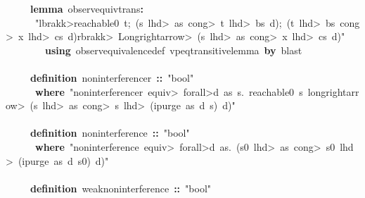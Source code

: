 \documentclass{article}
\newcommand{\syntaxKEYWORDA}[1]{\textcolor[rgb]{0.0,0.4,0.6}{\textbf{#1}}}
\newcommand{\syntaxKEYWORDB}[1]{\textcolor[rgb]{0.0,0.6,0.4}{\textbf{#1}}}
\newcommand{\syntaxLITERALA}[1]{\textcolor[rgb]{1.0,0.0,0.8}{#1}}
\newcommand{\syntaxOPERATOR}[1]{\textcolor[rgb]{0.0,0.0,0.0}{\textbf{#1}}}
\newcommand{\syntaxKEYWORDA}[1]{\textcolor[rgb]{0.0,0.4,0.6}{\textbf{#1}}}
\newcommand{\syntaxKEYWORDB}[1]{\textcolor[rgb]{0.0,0.6,0.4}{\textbf{#1}}}
\newcommand{\syntaxLITERALA}[1]{\textcolor[rgb]{1.0,0.0,0.8}{#1}}
\newcommand{\syntaxOPERATOR}[1]{\textcolor[rgb]{0.0,0.0,0.0}{\textbf{#1}}}
\newcommand{\syntaxKEYWORDA}[1]{\textcolor[rgb]{0.0,0.4,0.6}{\textbf{#1}}}
\newcommand{\syntaxKEYWORDB}[1]{\textcolor[rgb]{0.0,0.6,0.4}{\textbf{#1}}}
\newcommand{\syntaxLITERALA}[1]{\textcolor[rgb]{1.0,0.0,0.8}{#1}}
\newcommand{\syntaxOPERATOR}[1]{\textcolor[rgb]{0.0,0.0,0.0}{\textbf{#1}}}
\newcommand{\syntaxKEYWORDA}[1]{\textcolor[rgb]{0.0,0.4,0.6}{#1}}
\newcommand{\syntaxKEYWORDB}[1]{\textcolor[rgb]{0.0,0.6,0.4}{#1}}
\newcommand{\syntaxLITERALA}[1]{\textcolor[rgb]{1.0,0.0,0.8}{\textbf{#1}}}
\newcommand{\syntaxOPERATOR}[1]{\textcolor[rgb]{0.0,0.0,0.0}{#1}}
\newcommand{\syntaxKEYWORDA}[1]{\textcolor[rgb]{0.0,0.4,0.6}{\textbf{#1}}}
\newcommand{\syntaxKEYWORDB}[1]{\textcolor[rgb]{0.0,0.6,0.4}{\textbf{#1}}}
\newcommand{\syntaxLITERALA}[1]{\textcolor[rgb]{1.0,0.0,0.8}{#1}}
\newcommand{\syntaxOPERATOR}[1]{\textcolor[rgb]{0.0,0.0,0.0}{\textbf{#1}}}
\newcommand{\syntaxKEYWORDA}[1]{\textcolor[rgb]{0.0,0.4,0.6}{\textbf{#1}}}
\newcommand{\syntaxKEYWORDB}[1]{\textcolor[rgb]{0.0,0.6,0.4}{\textbf{#1}}}
\newcommand{\syntaxLITERALA}[1]{\textcolor[rgb]{1.0,0.0,0.8}{#1}}
\newcommand{\syntaxOPERATOR}[1]{\textcolor[rgb]{0.0,0.0,0.0}{\textbf{#1}}}
\begin{document}
{\ }{\ }{\ }{\ }{\ }\syntaxKEYWORDA{lemma}{\ }observ\usebox{\underscorebox}equiv\usebox{\underscorebox}trans\syntaxOPERATOR{:}\hspace*{\fill}\\
{\ }{\ }{\ }{\ }{\ }{\ }\syntaxLITERALA{"\<lbrakk>reachable0{\ }t;{\ }(s{\ }\<lhd>{\ }as{\ }\<cong>{\ }t{\ }\<lhd>{\ }bs{\ }\usebox{\atbox}{\ }d);{\ }(t{\ }\<lhd>{\ }bs{\ }\<cong>{\ }x{\ }\<lhd>{\ }cs{\ }\usebox{\atbox}{\ }d)\<rbrakk>{\ }\<Longrightarrow>{\ }(s{\ }\<lhd>{\ }as{\ }\<cong>{\ }x{\ }\<lhd>{\ }cs{\ }\usebox{\atbox}{\ }d)"}\hspace*{\fill}\\
{\ }{\ }{\ }{\ }{\ }{\ }{\ }{\ }\syntaxKEYWORDA{using}{\ }observ\usebox{\underscorebox}equivalence\usebox{\underscorebox}def{\ }vpeq\usebox{\underscorebox}transitive\usebox{\underscorebox}lemma{\ }\syntaxKEYWORDA{by}{\ }blast\hspace*{\fill}\\
\hspace*{\fill}\\
{\ }{\ }{\ }{\ }{\ }\syntaxKEYWORDA{definition}{\ }noninterference\usebox{\underscorebox}r{\ }\syntaxOPERATOR{::}{\ }\syntaxLITERALA{"bool"}\hspace*{\fill}\\
{\ }{\ }{\ }{\ }{\ }{\ }\syntaxKEYWORDB{where}{\ }\syntaxLITERALA{"noninterference\usebox{\underscorebox}r{\ }\<equiv>{\ }\<forall>d{\ }as{\ }s.{\ }reachable0{\ }s{\ }\<longrightarrow>{\ }(s{\ }\<lhd>{\ }as{\ }\<cong>{\ }s{\ }\<lhd>{\ }(ipurge{\ }as{\ }d{\ }s){\ }\usebox{\atbox}{\ }d)"}\hspace*{\fill}\\
\hspace*{\fill}\\
{\ }{\ }{\ }{\ }{\ }\syntaxKEYWORDA{definition}{\ }noninterference{\ }\syntaxOPERATOR{::}{\ }\syntaxLITERALA{"bool"}\hspace*{\fill}\\
{\ }{\ }{\ }{\ }{\ }{\ }\syntaxKEYWORDB{where}{\ }\syntaxLITERALA{"noninterference{\ }\<equiv>{\ }\<forall>d{\ }as.{\ }(s0{\ }\<lhd>{\ }as{\ }\<cong>{\ }s0{\ }\<lhd>{\ }(ipurge{\ }as{\ }d{\ }s0){\ }\usebox{\atbox}{\ }d)"}\hspace*{\fill}\\
\hspace*{\fill}\\
{\ }{\ }{\ }{\ }{\ }\syntaxKEYWORDA{definition}{\ }weak\usebox{\underscorebox}noninterference{\ }\syntaxOPERATOR{::}{\ }\syntaxLITERALA{"bool"}\hspace*{\fill}\\
\end{document}
